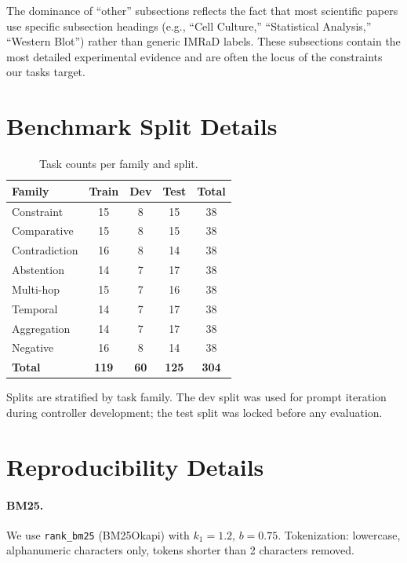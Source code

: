 \documentclass{article}
\begin{document}
The dominance of ``other'' subsections reflects the fact that most scientific papers use specific subsection headings (e.g., ``Cell Culture,'' ``Statistical Analysis,'' ``Western Blot'') rather than generic IMRaD labels. These subsections contain the most detailed experimental evidence and are often the locus of the constraints our tasks target.

\section{Benchmark Split Details}
\label{app:splits}

\begin{table}[ht]
\centering
\caption{Task counts per family and split.}
\small
\begin{tabular}{lcccc}
\toprule
\textbf{Family} & \textbf{Train} & \textbf{Dev} & \textbf{Test} & \textbf{Total} \\
\midrule
Constraint & 15 & 8 & 15 & 38 \\
Comparative & 15 & 8 & 15 & 38 \\
Contradiction & 16 & 8 & 14 & 38 \\
Abstention & 14 & 7 & 17 & 38 \\
Multi-hop & 15 & 7 & 16 & 38 \\
Temporal & 14 & 7 & 17 & 38 \\
Aggregation & 14 & 7 & 17 & 38 \\
Negative & 16 & 8 & 14 & 38 \\
\midrule
\textbf{Total} & \textbf{119} & \textbf{60} & \textbf{125} & \textbf{304} \\
\bottomrule
\end{tabular}
\label{tab:splits}
\end{table}

Splits are stratified by task family. The dev split was used for prompt iteration during controller development; the test split was locked before any evaluation.

\section{Reproducibility Details}
\label{app:repro}

\paragraph{BM25.} We use \texttt{rank\_bm25} (BM25Okapi) with $k_1{=}1.2$, $b{=}0.75$. Tokenization: lowercase, alphanumeric characters only, tokens shorter than 2 characters removed.
\end{document}
